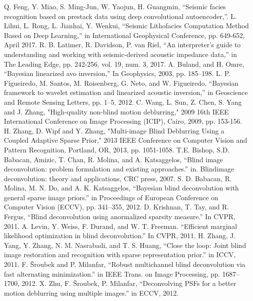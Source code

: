 \documentclass[conference]{IEEEtran}
\begin{document}
\begin{thebibliography}{00}
			Q. Feng, Y. Miao, S. Ming-Jun, W. Yaojun, H. Guangmin, ``Seismic facies recognition based on prestack data using deep convolutional autoencoder,''.
 			L. Lihui, L. Rong, L. Jianhai, Y. Wenkui, ``Seismic Lithofacies Computation Method Based on Deep Learning,'' in International Geophysical Conference, pp. 649-652, April 2017.
 		R. B. Latimer, R. Davidson, P. van Riel, ``An interpreter's guide to understanding and working with seismic-derived acoustic impedance data,'' in The Leading Edge, pp. 242-256, vol. 19, num. 3, 2017.
		A. Buland,  and H. Omre, ``Bayesian linearized avo inversion,'' In Geophysics, 2003, pp. 185--198.
	L. P. Figueiredo, M. Santos, M. Roisenberg, G. Neto, and W. Figueiredo, ``Bayesian framework to wavelet estimation and linearized acoustic inversion,'' in Geoscience and Remote Sensing Letters, pp. 1--5, 2012.
		C. Wang, L. Sun, Z. Chen, S. Yang and J. Zhang, "High-quality non-blind motion deblurring," 2009 16th IEEE International Conference on Image Processing (ICIP), Cairo, 2009, pp. 153-156.
		H. Zhang, D. Wipf and Y. Zhang, "Multi-image Blind Deblurring Using a Coupled Adaptive Sparse Prior," 2013 IEEE Conference on Computer Vision and Pattern Recognition, Portland, OR, 2013, pp. 1051-1058.
		T.E. Bishop, S.D. Babacan, Amizic, T. Chan, R. Molina, and A. Katsaggelos, ``Blind image deconvolution: problem formulation and existing approaches.'' in. Blindimage deconvolution: theory and applications,  CRC press, 2007.
		S. D. Babacan, R. Molina, M. N. Do, and A. K. Katsaggelos, ``Bayesian blind deconvolution with general sparse image priors.'' in Proceedings of European Conference on Computer Vision (ECCV), pp. 341–355, 2012.
		D. Krishnan, T. Tay, and R. Fergus, ``Blind deconvolution using anormalized sparsity measure.'' In CVPR, 2011.
		A. Levin, Y. Weiss, F. Durand, and W. T. Freeman. ``Efficient marginal likelihood optimization in blind deconvolution.'' In CVPR, 2011.
		H. Zhang, J. Yang, Y. Zhang, N. M. Nasrabadi, and T. S. Huang, ``Close the loop: Joint blind image restoration and recognition with sparse representation prior.'' in ICCV, 2011. 
		F. Šroubek and P. Milanfar, ``Robust multichannel blind deconvolution via fast alternating minimization.'' in IEEE Trans. on Image Processing, pp. 1687–1700, 2012.
		X. Zhu, F. Šroubek, P. Milanfar, ``Deconvolving PSFs for a better motion deblurring using multiple images.'' in ECCV, 2012.

\end{thebibliography}
\end{document}
